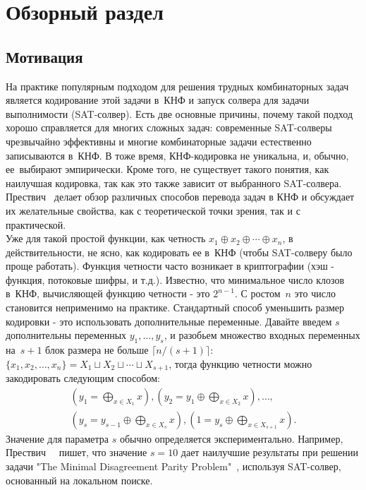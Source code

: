 \section{Обзорный раздел}

\subsection{Мотивация}
На практике популярным подходом для решения трудных комбинаторных задач является кодирование этой задачи в~КНФ и запуск солвера для задачи выполнимости (SAT-солвер). 
Есть две основные причины, почему такой подход хорошо справляется для многих сложных задач: 
современные SAT-солверы  чрезвычайно эффективны и 
многие комбинаторные задачи естественно записываются в~КНФ. В тоже время, КНФ-кодировка не уникальна, и, обычно, ее~выбирают эмпирически. 
Кроме того, не существует такого понятия, как наилучшая кодировка, так как это также зависит от выбранного SAT-солвера. Прествич~\cite{DBLP:series/faia/Prestwich09} делает обзор различных способов перевода задач в КНФ и обсуждает их желательные свойства, как с теоретической точки зрения, так и с практической. \\
Уже для такой простой функции, как четность $x_1 \oplus x_2 \oplus \dotsb \oplus x_n$, 
в действительности, не ясно, как кодировать ее в~КНФ (чтобы SAT-солверу было проще работать). 
Функция четности часто возникает в криптографии (хэш - функция, потоковые шифры, и т.д.). 
Известно, что минимальное число клозов в~КНФ, вычисляющей функцию четности - это $2^{n-1}$. 
С ростом~$n$ это число становится неприменимо на практике. 
Стандартный способ уменьшить размер кодировки - это использовать дополнительные переменные. 
Давайте введем $s$ дополнительны переменных $y_1, \dotsc, y_s$, и разобьем множество входных переменных на~$s+1$ блок размера не больше $\lceil n/(s+1) \rceil$: $\{x_1, x_2, \dotsc, x_n\}=X_1 \sqcup X_2 \sqcup \dotsb \sqcup X_{s+1}$, 
тогда функцию четности можно закодировать следующим способом: 
\begin{multline}\label{eq:blocks}
	\left(y_1=\bigoplus_{x \in X_1}x\right),
	\left(y_2=y_1 \oplus \bigoplus_{x \in X_2}x\right), \dotsc,\\
	\left(y_s=y_{s-1} \oplus \bigoplus_{x \in X_s}x\right),
	\left(1=y_s \oplus \bigoplus_{x \in X_{s+1}}x\right).
\end{multline}
Значение для параметра $s$ обычно определяется экспериментально. Например, Прествич~~\cite{DBLP:series/faia/Prestwich09} пишет, что значение $s = 10$ дает наилучшие результаты при решении задачи "The Minimal Disagreement Parity Problem"\ \cite{Crawford1995TheMD}, используя SAT-солвер, основанный на локальном поиске.

